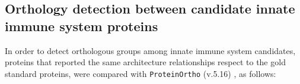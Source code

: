 \documentclass[11pt]{article}
\begin{document}



\subsection*{Orthology detection between candidate innate immune system 
proteins}
In order to detect orthologous groups among innate immune system candidates, 
proteins that reported the same architecture relationships respect to the gold 
standard proteins, were compared with \texttt{ProteinOrtho} 
(v.5.16) \cite{Lechner2011}, as follows:

\end{document}
